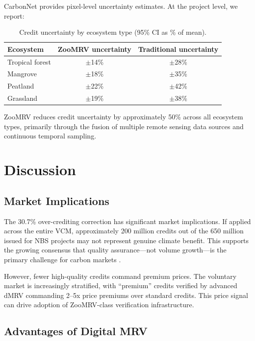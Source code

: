 \documentclass[11pt,a4paper]{article}
\begin{document}
CarbonNet provides pixel-level uncertainty estimates. At the project
level, we report:

\begin{table}[H]
\centering
\caption{Credit uncertainty by ecosystem type (95\% CI as \% of mean).}
\label{tab:uncertainty}
\begin{tabular}{lcc}
\toprule
\textbf{Ecosystem} & \textbf{ZooMRV uncertainty} &
  \textbf{Traditional uncertainty} \\
\midrule
Tropical forest & $\pm$14\% & $\pm$28\% \\
Mangrove & $\pm$18\% & $\pm$35\% \\
Peatland & $\pm$22\% & $\pm$42\% \\
Grassland & $\pm$19\% & $\pm$38\% \\
\bottomrule
\end{tabular}
\end{table}

ZooMRV reduces credit uncertainty by approximately 50\% across all
ecosystem types, primarily through the fusion of multiple remote sensing
data sources and continuous temporal sampling.


\section{Discussion}
\label{sec:discussion}

\subsection{Market Implications}

The 30.7\% over-crediting correction has significant market implications.
If applied across the entire VCM, approximately 200 million credits out
of the 650 million issued for NBS projects may not represent genuine
climate benefit. This supports the growing consensus that quality
assurance---not volume growth---is the primary challenge for carbon
markets \citep{badgley2022}.

However, fewer high-quality credits command premium prices. The voluntary
market is increasingly stratified, with ``premium'' credits verified by
advanced dMRV commanding 2--5x price premiums over standard credits.
This price signal can drive adoption of ZooMRV-class verification
infrastructure.

\subsection{Advantages of Digital MRV}
\end{document}

